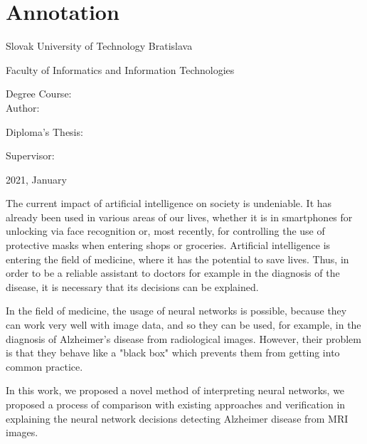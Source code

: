 
\thispagestyle{empty}

\section*{Annotation}

\begin{minipage}[t]{1\columnwidth}%
Slovak University of Technology Bratislava 

Faculty of Informatics and Information Technologies

Degree Course: \myStudyProgramEng\\

Author: \myName

Diploma's Thesis: \myTitleEng

Supervisor: \mySupervisorEng

2021, January
\end{minipage}

\bigskip{}

The current impact of artificial intelligence on society is undeniable. It has already been used in various areas of our lives, whether it is in smartphones for unlocking via face recognition or, most recently, for controlling the use of protective masks when entering shops or groceries. Artificial intelligence is entering the field of medicine, where it has the potential to save lives. Thus, in order to be a reliable assistant to doctors for example in the diagnosis of the disease, it is necessary that its decisions can be explained.

In the field of medicine, the usage of neural networks is possible, because they can work very well with image data, and so they can be used, for example, in the diagnosis of Alzheimer's disease from radiological images. However, their problem is that they behave like a "black box" which prevents them from getting into common practice.

In this work, we proposed a novel method of interpreting neural networks, we proposed a process of comparison with existing approaches and verification in explaining the neural network decisions detecting Alzheimer disease from MRI images.

\newpage
\thispagestyle{empty}
\mbox{}
\newpage